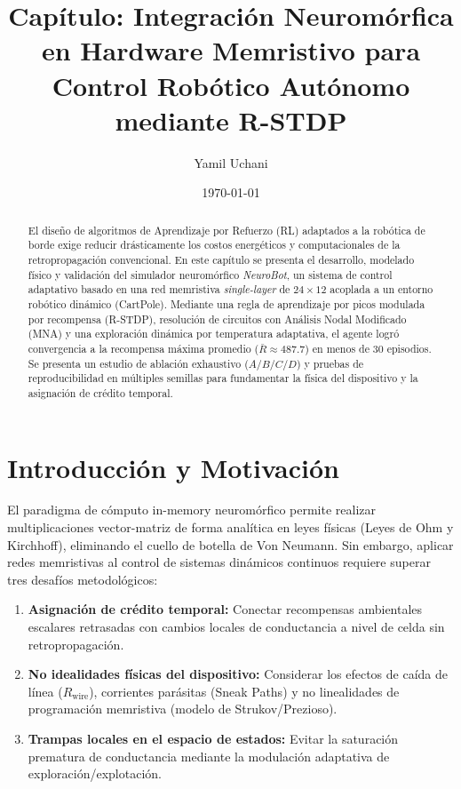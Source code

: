 \documentclass[12pt,a4paper]{article}
\title{Capítulo: Integración Neuromórfica en Hardware Memristivo para Control Robótico Autónomo mediante R-STDP}
\author{Yamil Uchani}
\date{\today}
\begin{document}
\maketitle

\begin{abstract}
El diseño de algoritmos de Aprendizaje por Refuerzo (RL) adaptados a la robótica de borde exige reducir drásticamente los costos energéticos y computacionales de la retropropagación convencional. En este capítulo se presenta el desarrollo, modelado físico y validación del simulador neuromórfico \textit{NeuroBot}, un sistema de control adaptativo basado en una red memristiva \textit{single-layer} de $24 \times 12$ acoplada a un entorno robótico dinámico (CartPole). Mediante una regla de aprendizaje por picos modulada por recompensa (R-STDP), resolución de circuitos con Análisis Nodal Modificado (MNA) y una exploración dinámica por temperatura adaptativa, el agente logró convergencia a la recompensa máxima promedio ($\bar{R} \approx 487.7$) en menos de 30 episodios. Se presenta un estudio de ablación exhaustivo ($A/B/C/D$) y pruebas de reproducibilidad en múltiples semillas para fundamentar la física del dispositivo y la asignación de crédito temporal.
\end{abstract}

\section{Introducción y Motivación}
El paradigma de cómputo in-memory neuromórfico permite realizar multiplicaciones vector-matriz de forma analítica en leyes físicas (Leyes de Ohm y Kirchhoff), eliminando el cuello de botella de Von Neumann. Sin embargo, aplicar redes memristivas al control de sistemas dinámicos continuos requiere superar tres desafíos metodológicos:
\begin{enumerate}
    \item \textbf{Asignación de crédito temporal:} Conectar recompensas ambientales escalares retrasadas con cambios locales de conductancia a nivel de celda sin retropropagación.
    \item \textbf{No idealidades físicas del dispositivo:} Considerar los efectos de caída de línea ($R_{\text{wire}}$), corrientes parásitas (Sneak Paths) y no linealidades de programación memristiva (modelo de Strukov/Prezioso).
    \item \textbf{Trampas locales en el espacio de estados:} Evitar la saturación prematura de conductancia mediante la modulación adaptativa de exploración/explotación.
\end{enumerate}
\end{document}
